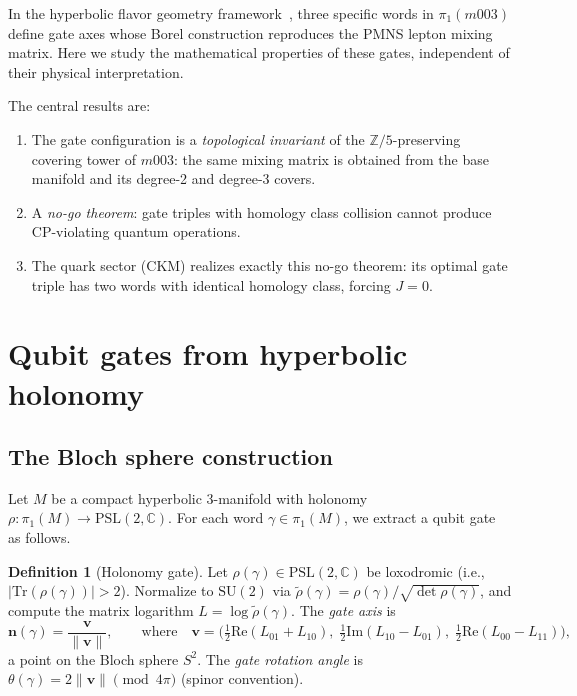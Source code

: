 \documentclass[12pt]{article}
\theoremstyle{definition}
\newtheorem{definition}[theorem]{Definition}
\begin{document}
In the hyperbolic flavor geometry framework~\cite{Gentry:PMNS,
Gentry:CKM}, three specific words in $\pi_1(m003)$ define gate
axes whose Borel construction reproduces the PMNS lepton mixing
matrix. Here we study the mathematical properties of these gates,
independent of their physical interpretation.

The central results are:
\begin{enumerate}
  \item The gate configuration is a \emph{topological invariant}
    of the $\mathbb{Z}/5$-preserving covering tower of $m003$:
    the same mixing matrix is obtained from the base manifold and
    its degree-2 and degree-3 covers.
  \item A \emph{no-go theorem}: gate triples with homology class
    collision cannot produce CP-violating quantum operations.
  \item The quark sector (CKM) realizes exactly this no-go
    theorem: its optimal gate triple has two words with identical
    homology class, forcing $J = 0$.
\end{enumerate}

\section{Qubit gates from hyperbolic holonomy}
\label{sec:gates}

\subsection{The Bloch sphere construction}

Let $M$ be a compact hyperbolic 3-manifold with holonomy
$\rho: \pi_1(M) \to \mathrm{PSL}(2,\mathbb{C})$.
For each word $\gamma \in \pi_1(M)$, we extract a qubit gate
as follows.

\begin{definition}[Holonomy gate]
\label{def:gate}
Let $\rho(\gamma) \in \mathrm{PSL}(2,\mathbb{C})$ be loxodromic
(i.e., $|\mathrm{Tr}(\rho(\gamma))| > 2$). Normalize to
$\mathrm{SU}(2)$ via $\tilde{\rho}(\gamma) = \rho(\gamma) /
\sqrt{\det\rho(\gamma)}$, and compute the matrix logarithm
$L = \log\tilde{\rho}(\gamma)$. The \emph{gate axis} is
\[
  \mathbf{n}(\gamma) = \frac{\mathbf{v}}{\|\mathbf{v}\|},
  \qquad \text{where} \quad
  \mathbf{v} = \bigl(
    \tfrac{1}{2}\mathrm{Re}(L_{01}+L_{10}),\;
    \tfrac{1}{2}\mathrm{Im}(L_{10}-L_{01}),\;
    \tfrac{1}{2}\mathrm{Re}(L_{00}-L_{11})
  \bigr),
\]
a point on the Bloch sphere $S^2$.
The \emph{gate rotation angle} is $\theta(\gamma) = 2\|\mathbf{v}\|
\pmod{4\pi}$ (spinor convention).
\end{definition}
\end{document}
